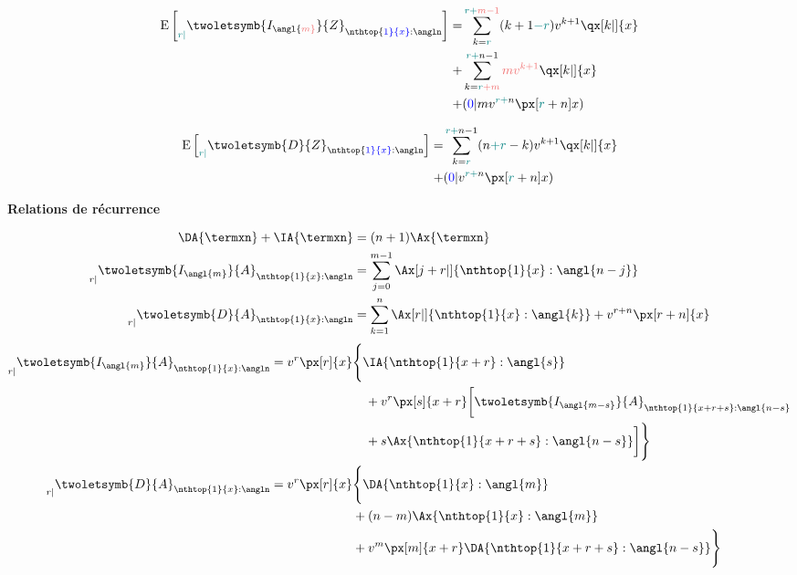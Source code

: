 \documentclass[10pt, french]{article}
\begin{document}
\begin{multicols*}{3}
\begin{align*}
	\esp{\prescript{}{\color{teal}r|}{\twoletsymb{I_{\angl{\color{red_rectangle}m}}}{Z}_{\nthtop{\color{blue}1}{x}:\angln}}} = 
	&\sum\limits_{ k = {\color{teal}r }}^{{\color{teal} r + }{\color{red_rectangle}m - 1}} ( k + 1 {\color{teal}- r} ) v^{k + 1} \qx[k|]{x}  \\
	+ &\sum_{ k = {\color{teal}r} {\color{red_rectangle} + m}}^{ {\color{teal} r +} n - 1 } {\color{red_rectangle}mv^{k + 1}} \qx[k|]{x}  \\
	+ &({\color{blue}0}|mv^{{\color{teal}r +}n} \px[ {\color{teal}r} +n ]{x})
\end{align*}

\begin{align*}
	\esp{\prescript{}{\color{teal}r|}{\twoletsymb{D}{Z}_{\nthtop{\color{blue}1}{x}:\angln}}} = 
	&\sum\limits_{ k = {\color{teal}r }}^{{\color{teal} r + }n - 1} ( n {\color{teal} + r} - k ) v^{k + 1} \qx[k|]{x}  \\
	+ &({\color{blue}0}|v^{{\color{teal}r +}n} \px[ {\color{teal}r} +n ]{x})
\end{align*}

\textbf{Relations de récurrence}

\begin{align*}
	\DA{\termxn} + \IA{\termxn} &= (n + 1) \Ax{\termxn} \\
	\prescript{}{r|}{\twoletsymb{I_{\angl{m}}}{A}_{\nthtop{1}{x}:\angln}} 
	&= \sum_{j = 0}^{m - 1} \Ax[j + r|]{\nthtop{1}{x}:\angl{n - j}} \\
	\prescript{}{r|}{\twoletsymb{D}{A}_{\nthtop{1}{x}:\angln}} 
	&= \sum_{k = 1}^{n} \Ax[r|]{\nthtop{1}{x}:\angl{k}} + v^{r + n} \px[r + n]{x} \\
\end{align*}
\begin{align*}
\prescript{}{r|}{\twoletsymb{I_{\angl{m}}}{A}_{\nthtop{1}{x}:\angln}} 
	= v^r \px[r]{x} 
	&\Bigg\{
		\IA{\nthtop{1}{x + r}:\angl{s}} \\
		&\quad + v^r \px[s]{x + r} 
		\bigg[
			\twoletsymb{I_{\angl{m - s}}}{A}_{\nthtop{1}{x + r + s}:\angl{n - s}} \\
		&\quad +  s \Ax{\nthtop{1}{x + r + s}:\angl{n - s}}
		\bigg]
	\Bigg\} \\
	\prescript{}{r|}{\twoletsymb{D}{A}_{\nthtop{1}{x}:\angln}} 
	= v^r \px[r]{x} 
	&\Bigg\{
		\DA{\nthtop{1}{x}:\angl{m}} \\
		& + (n - m) \Ax{\nthtop{1}{x}:\angl{m}} \\
		& + v^m \px[m]{x + r} \DA{\nthtop{1}{x + r + s}:\angl{n - s}}
	\Bigg\}
\end{align*}


\end{multicols*}
\end{document}
